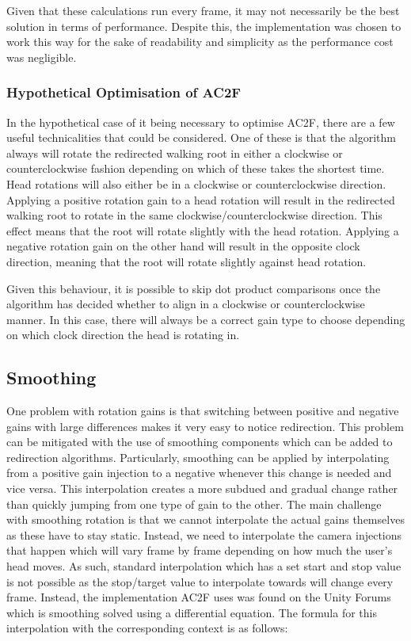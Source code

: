 Given that these calculations run every frame, it may not necessarily be the best solution in terms of performance. Despite this, the implementation was chosen to work this way for the sake of readability and simplicity as the performance cost was negligible. 

\subsubsection{Hypothetical Optimisation of AC2F}
In the hypothetical case of it being necessary to optimise AC2F, there are a few useful technicalities that could be considered. One of these is that the algorithm always will rotate the redirected walking root in either a clockwise or counterclockwise fashion depending on which of these takes the shortest time. Head rotations will also either be in a clockwise or counterclockwise direction. Applying a positive rotation gain to a head rotation will result in the redirected walking root to rotate in the same clockwise/counterclockwise direction. This effect means that the root will rotate slightly with the head rotation. Applying a negative rotation gain on the other hand will result in the opposite clock direction, meaning that the root will rotate slightly against head rotation. 

Given this behaviour, it is possible to skip dot product comparisons once the algorithm has decided whether to align in a clockwise or counterclockwise manner. In this case, there will always be a correct gain type to choose depending on which clock direction the head is rotating in.

\subsection{Smoothing}
One problem with rotation gains is that switching between positive and negative gains with large differences makes it very easy to notice redirection. This problem can be mitigated with the use of smoothing components which can be added to redirection algorithms. Particularly, smoothing can be applied by interpolating from a positive gain injection to a negative whenever this change is needed and vice versa. This interpolation creates a more subdued and gradual change rather than quickly jumping from one type of gain to the other. The main challenge with smoothing rotation is that we cannot interpolate the actual gains themselves as these have to stay static. Instead, we need to interpolate the camera injections that happen which will vary frame by frame depending on how much the user's head moves. As such, standard interpolation which has a set start and stop value is not possible as the stop/target value to interpolate towards will change every frame. Instead, the implementation AC2F uses was found on the Unity Forums~\cite{smoothingFormula} which is smoothing solved using a differential equation. The formula for this interpolation with the corresponding context is as follows:

